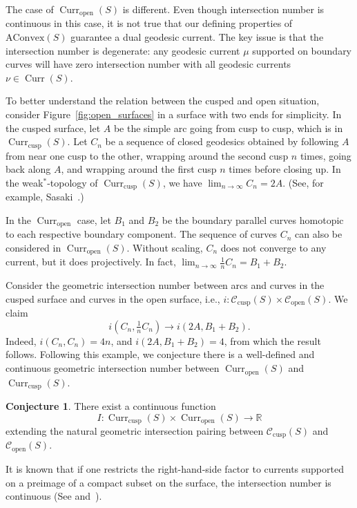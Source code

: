 \documentclass[11pt]{amsart}
\numberwithin{equation}{section}
\numberwithin{figure}{section}
\theoremstyle{definition}
\newtheorem{conjecture}[theorem]{Conjecture}
\theoremstyle{plain}
\DeclareMathOperator{\Curr}{Curr}
\newcommand{\AConvex}{\mathrm{AConvex}}
\newcommand{\Curves}{\mathcal{C}}
\begin{document}
The case of $\Curr_{\mathrm{open}}(S)$ is different. Even though intersection number is continuous in this case, it is not true that our defining properties of $\AConvex(S)$ guarantee a dual geodesic current.
The key issue is that the intersection number is degenerate: any
geodesic current $\mu$ supported on boundary curves will have zero
intersection number with all geodesic currents $\nu \in \Curr(S)$.

To better understand the relation between the cusped and open
situation, consider Figure~\ref{fig:open_surfaces} in a surface with
two ends for simplicity.
In the cusped surface, let $A$ be the simple arc going from cusp to cusp, which is in $\Curr_{\mathrm{cusp}}(S)$.
Let $C_n$ be a sequence of closed geodesics obtained by following $A$
from near one cusp to the other, wrapping around the second cusp $n$ times,
going back along $A$, and wrapping around the first cusp $n$ times
before closing up. In the weak$^*$-topology of
$\Curr_{\mathrm{cusp}}(S)$, we have $\lim_{n\to\infty}C_n = 2A$. (See, for example,
Sasaki~\cite[Section~6]{Sas22:Currents}.)

In the $\Curr_{\mathrm{open}}$ case, let $B_1$ and $B_2$ be the
boundary parallel curves homotopic to each respective boundary
component. The sequence of curves $C_n$ can also be considered in
$\Curr_{\mathrm{open}}(S)$. Without scaling, $C_n$ does not converge
to any current, but it does projectively. In fact, $\lim_{n \to
  \infty} \frac{1}{n} C_n = B_1 + B_2$.

Consider the geometric intersection number between arcs and curves in the cusped surface and curves in the open surface, i.e., $i \colon \Curves_{\mathrm{cusp}}(S) \times \Curves_{\mathrm{open}}(S)$.
We claim
\[
i(C_n, \tfrac{1}{n} C_n) \to i(2A, B_1 + B_2).
\]
Indeed, $i(C_n, C_n) = 4n$, and $i(2A, B_1+B_2)=4$, from which the result follows.
Following this example, we conjecture there is a well-defined and
continuous geometric intersection number between
$\Curr_{\mathrm{open}}(S)$ and $\Curr_{\mathrm{cusp}}(S)$.

\begin{conjecture}
There exist a continuous function 
\[
I \colon \Curr_{\mathrm{cusp}}(S) \times \Curr_{\mathrm{open}}(S) \to \mathbb{R}
\]
extending the natural geometric intersection pairing between $\Curves_{\mathrm{cusp}}(S)$ and $\Curves_{\mathrm{open}}(S)$.
\end{conjecture}

It is known that if one restricts the right-hand-side
factor to currents supported on a preimage of a compact subset on the
surface, the intersection number is continuous
(See \cite[Theorem~2.4]{BIPP21:Systoles}
and~\cite[Section~6]{Sas22:Currents}).
\end{document}
